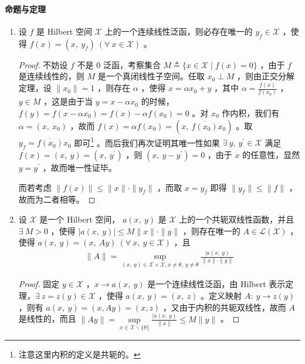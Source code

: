 \paragraph{命题与定理}
\begin{enumerate}[leftmargin=2cm, label=\arabic*]
    \item 设 $f$ 是 Hilbert 空间 $\mathscr{X}$ 上的一个连续线性泛函，则必存在唯一的 $y_f\in\mathscr{X}$ ，使得 $f(x) = (x,\ y_f)\ (\forall\ x\in\mathscr{X})$ 。
    \begin{proof}
        不妨设 $f$ 不是 $0$ 泛函，考察集合 $M\triangleq\{x\in\mathscr{X}\mid f(x) = 0\}$ ，由于 $f$ 是连续线性的，则 $M$ 是一个真闭线性子空间。任取 $x_0\perp M$ ，则由正交分解定理，设 $\|x_0\|= 1 $ ，则存在 $\alpha$ ，使得 $x = \alpha x_0 + y $ ，其中 $\alpha = \frac{f(x)}{f(x_0)}$ ，$y\in M$ ，这是由于当 $y=x-\alpha x_0$ 的时候，$f(y) = f(x-\alpha x_0) = f(x) - \alpha f(x_0) = 0$ 。对 $x_0$ 作内积，我们有 $\alpha = (x,\ x_0)$ ，故而 $f(x) = \alpha f(x_0) = (x,\ \overline{f(x_0)}x_0)$ 。取 $y_f = \overline{f(x_0)}x_0$ 即可\footnote{注意这里内积的定义是共轭的。} 。而后我们再次证明其唯一性如果 $\exists\ y,\ y^{\prime}\in \mathscr{X}$ 满足 $f(x) = (x,\ y) = (x,\ y^{\prime})$ ，则 $(x,\ y-y^{\prime}) = 0$ ，由于 $x$ 的任意性，显然 $y = y^{\prime}$ ，故而唯一性证毕。
    
    而若考虑 $\|f(x)\|\leqslant\|x\|\cdot \|y_f\|$ ，而取 $x = y_f$ 即得 $\|y_f\|\leqslant\|f\|$ ，故而为二者相等。
    \end{proof}
    \item 设 $\mathscr{X}$ 是一个 Hilbert 空间， $a(x,\ y)$ 是 $\mathscr{X}$ 上的一个共轭双线性函数，并且 $\exists\ M>0$ ，使得 $|a(x,\ y)|\leqslant M\|x\|\cdot\|y\|$ ，则存在唯一的 $A\in\mathscr{L}(\mathscr{X})$ ，使得 $a(x,\ y)= (x,\ Ay)\ (\forall\ x,\ y\in \mathscr{X})$ ，且
\begin{align*}
    \|A\| = \sup\limits_{(x,\ y)\in\mathscr{X}\times\mathscr{X}, x\neq\theta,\ y\neq\theta} \frac{|a(x,\ y)}{\|x\|\cdot\|y\|}
\end{align*}
\begin{proof}
    固定 $y\in\mathscr{X}$ ，$x\to a(x,\ y)$ 是一个连续线性泛函，由 Hilbert 表示定理，$\exists\ z=z(y)\in\mathscr{X}$ ，使得 $a(x,\ y) = (x,\ z)$ 。定义映射 $A:\ y\to z(y)$ ，则有 $a(x,\ y) = (x, Ay) = (x, z)$ ，又由于内积的共轭双线性，故而 $A$ 是线性的，而且 $\|Ay\| = \sup\limits_{x\in\mathscr{X}\backslash\{\theta\}}\frac{|a(x,\ y)}{\|x\|}\leqslant M\|y\|$ 。 
\end{proof}
\end{enumerate} 



